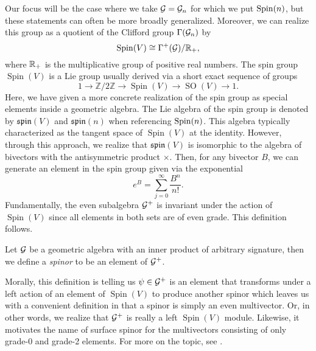 Our focus will be the case where we take $\mathcal{G}=\mathcal{G}_n$ for which we put $\operatorname{Spin}(n)$, but these statements can often be more broadly generalized. Moreover, we can realize this group as a quotient of the Clifford group $\Gamma(\mathcal{G}_n)$ by
\begin{equation}
\operatorname{Spin}(V) \cong \Gamma^+(\mathcal{G})/\mathbb{R}_+,
\end{equation}
where $\mathbb{R}_+$ is the multiplicative group of positive real numbers. The spin group $\operatorname{Spin}(V)$ is a Lie group usually derived via a short exact sequence of groups
\begin{equation}
1 \to \mathbb{Z}/2\mathbb{Z} \to \operatorname{Spin}(V) \to \operatorname{SO}(V) \to 1.
\end{equation}
Here, we have given a more concrete realization of the spin group as special elements inside a geometric algebra. The Lie algebra of the spin group is denoted by $\mathfrak{spin}(V)$ and $\mathfrak{spin}(n)$ when referencing $\operatorname{Spin}(n)$. This algebra typically characterized as the tangent space of $\operatorname{Spin}(V)$ at the identity. However, through this approach, we realize that $\mathfrak{spin}(V)$ is isomorphic to the algebra of bivectors with the antisymmetric product $\times$.  Then, for any bivector $B$, we can generate an element in the spin group given via the exponential
\begin{equation}
e^{B} = \sum_{j=0}^\infty \frac{B^n}{n!}.
\end{equation}
Fundamentally, the even subalgebra $\mathcal{G}^+$ is invariant under the action of $\operatorname{Spin}(V)$ since all elements in both sets are of even grade. This definition follows.
\begin{definition}
Let $\mathcal{G}$ be a geometric algebra with an inner product of arbitrary signature, then we define a \emph{spinor} to be an element of $\mathcal{G}^+$.
\end{definition}
Morally, this definition is telling us $\psi \in \mathcal{G}^+$ is an element that transforms under a left action of an element of $\operatorname{Spin}(V)$ to produce another spinor which leaves us with a convenient definition in that a spinor is simply an even multivector. Or, in other words, we realize that $\mathcal{G}^+$ is really a left $\operatorname{Spin}(V)$ module. Likewise, it motivates the name of surface spinor for the multivectors consisting of only grade-0 and grade-2 elements. For more on the topic, see \cite{janssens_special_nodate}.


